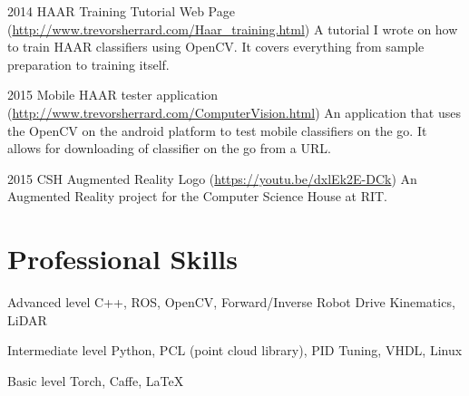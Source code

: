 \documentclass{tccv}
\begin{document}
\begin{yearlist}

\item{2014}
     {HAAR Training Tutorial Web Page (\href{http://www.trevorsherrard.com/Haar_training.html}{http://www.trevorsherrard.com\newline/Haar\_training.html})}
     {A tutorial I wrote on how to train HAAR classifiers using OpenCV. It covers everything from sample preparation to training itself.}
     
\item{2015}
     {Mobile HAAR tester application (\href{http://www.trevorsherrard.com/ComputerVision.html}{http://www.trevorsherrard.com\newline/ComputerVision.html})}
     {An application that uses the OpenCV on the android platform to test mobile classifiers on the go. It allows for downloading of classifier on the go from a URL.}
     
\item{2015}
     {CSH Augmented Reality Logo (\href{https://youtu.be/dxlEk2E-DCk}{https://youtu.be/dxlEk2E-DCk})}
     {An Augmented Reality project for the Computer Science House at RIT.}

\end{yearlist}


\section{Professional Skills}
\begin{factlist}

\item{Advanced  level}
     {C++, ROS, OpenCV, Forward/Inverse Robot Drive Kinematics, LiDAR}

\item{Intermediate level}
     {Python, PCL (point cloud library), PID Tuning, VHDL, Linux}

\item{Basic level}
     {Torch, Caffe, \LaTeX}

\end{factlist}
\end{document}
